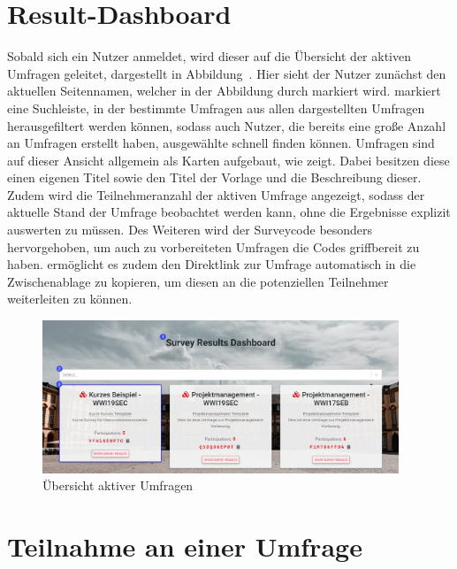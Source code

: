 \section{Result-Dashboard}
\label{ssec:ResultDashboard}

Sobald sich ein Nutzer anmeldet, wird dieser auf die Übersicht der aktiven Umfragen geleitet, dargestellt in Abbildung~.
Hier sieht der Nutzer zunächst den aktuellen Seitennamen, welcher in der Abbildung durch \desOne markiert wird.
\desTwo markiert eine Suchleiste, in der bestimmte Umfragen aus allen dargestellten Umfragen herausgefiltert werden können, sodass auch Nutzer, die bereits eine große Anzahl an Umfragen erstellt haben, ausgewählte schnell finden können.
Umfragen sind auf dieser Ansicht allgemein als Karten aufgebaut, wie \desThree zeigt.
Dabei besitzen diese einen eigenen Titel sowie den Titel der Vorlage und die Beschreibung dieser.
Zudem wird die Teilnehmeranzahl der aktiven Umfrage angezeigt, sodass der aktuelle Stand der Umfrage beobachtet werden kann, ohne die Ergebnisse explizit auswerten zu müssen.
Des Weiteren wird der Surveycode besonders hervorgehoben, um auch zu vorbereiteten Umfragen die Codes griffbereit zu haben.
\faClipboard\xspace ermöglicht es zudem den Direktlink zur Umfrage automatisch in die Zwischenablage zu kopieren, um diesen an die potenziellen Teilnehmer weiterleiten zu können.

\begin{figure}[H]
	\centering
	\includegraphics[width=0.95\textwidth, keepaspectratio]{img/guide/ResultDashboard.png}
	\captionsetup{justification=centering, format=plain}
	\caption[Übersicht aktiver Umfragen]{Übersicht aktiver Umfragen \\\quelleScreenshot}
	\label{fig:ResultDashboard}
\end{figure}


\section{Teilnahme an einer Umfrage}
\label{ssec:TeilnahmeAnEinerUmfrage}

